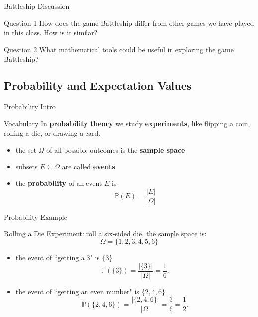 \documentclass{beamer}
\begin{document}
\begin{frame}{Battleship Discussion}
\pause
  \begin{block}{Question 1}
    How does the game Battleship differ from other games we have played in this class.
    How is it similar?
  \end{block}
\pause
  \begin{block}{Question 2}
    What mathematical tools could be useful in exploring the game Battleship?
  \end{block}
\end{frame}

\subsection{Probability and Expectation Values}

\begin{frame}{Probability Intro}
  \begin{block}{Vocabulary}
    In \textbf{probability theory} we study \textbf{experiments}, like flipping a coin, rolling a die, or drawing a card.\\
    \begin{itemize}
\pause
      \item the set $\Omega$ of all possible outcomes is the \textbf{sample space}
\pause
      \item subsets $E\subseteq \Omega$ are called \textbf{events}
\pause
      \item the \textbf{probability} of an event $E$ is
      $$\mathbb{P}(E) = \frac{|E|}{|\Omega|}$$
    \end{itemize}
  \end{block}
\end{frame}

\begin{frame}{Probability Example}
  \begin{block}{Rolling a Die}
    Experiment: roll a six-sided die, the sample space is:
    $$\Omega = \{1,2,3,4,5,6\}$$
    \begin{itemize}
\pause
      \item the event of ``getting a 3" is $\{3\}$
      $$\mathbb{P}(\{3\}) = \frac{|\{3\}|}{|\Omega|} = \frac{1}{6}.$$
\pause
      \item the event of ``getting an even number" is $\{2,4,6\}$
      $$\mathbb{P}(\{2,4,6\}) = \frac{|\{2,4,6\}|}{|\Omega|} = \frac{3}{6} = \frac{1}{2}.$$
    \end{itemize}
  \end{block}
\end{frame}
\end{document}
